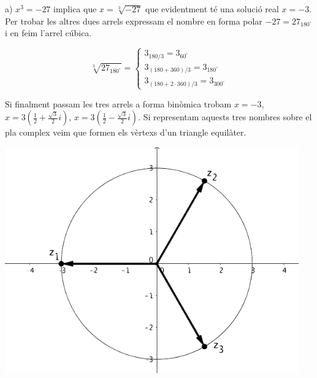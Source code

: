 \begin{example}
	a) $x^3=-27$ implica que $x=\sqrt[3]{-27}$ que evidentment té una solució real $x=-3$. Per trobar les altres dues arrels expressam el nombre en forma polar $-27=27_{180^\circ}$ i 
	en feim l'arrel cúbica.
	
	\begin{minipage}{0.7\textwidth}

	\begin{equation*}
	\sqrt[3]{27_{180^\circ}} = \left\{ 
	\begin{array}{l}
	3_{180/3} = 3_{60^\circ} \\
	3_{(180+360)/3} = 3_{180^\circ} \\
	3_{(180+2\cdot 360)/3} = 3_{300^\circ}  
	\end{array}
	\right.
	\end{equation*}
	
Si finalment passam les tres arrels a forma binòmica trobam \linebreak $x=-3$, $x=3(\frac{1}{2}+\frac{\sqrt{3}}{2}i)$, $x=3(\frac{1}{2}-\frac{\sqrt{3}}{2}i)$. Si representam aquests tres nombres sobre el pla
complex veim que formen els vèrtexs d'un triangle equilàter.
	\end{minipage}
	\begin{minipage}{0.3\textwidth}
		\begin{center}
		\includegraphics[width=0.95\textwidth]{img-04/chap-complex-3root}		
		\end{center}
	\end{minipage}

	 
\end{example}

